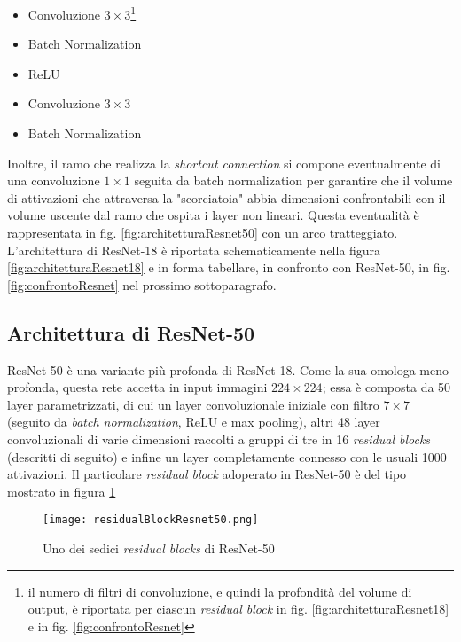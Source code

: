 \begin{itemize}
\item Convoluzione $3\times 3$\footnote{il numero di filtri di convoluzione, e quindi la profondità del volume di output, è riportata per ciascun \textit{residual block} in fig. \ref{fig:architetturaResnet18} e in fig. \ref{fig:confrontoResnet}}
\item Batch Normalization
\item ReLU
\item Convoluzione $3\times 3$
\item Batch Normalization
\end{itemize}

Inoltre, il ramo che realizza la \textit{shortcut connection} si compone eventualmente di una convoluzione $1\times 1$ seguita da batch normalization per garantire che il volume di attivazioni che attraversa la "scorciatoia" abbia dimensioni confrontabili con il volume uscente dal ramo che ospita i layer non lineari. Questa eventualità è rappresentata in fig. \ref{fig:architetturaResnet50} con un arco tratteggiato.\\

L'architettura di ResNet-18 è riportata schematicamente nella figura \ref{fig:architetturaResnet18} e in forma tabellare, in confronto con ResNet-50, in fig. \ref{fig:confrontoResnet} nel prossimo sottoparagrafo.

\subsection{Architettura di ResNet-50}
ResNet-50 è una variante più profonda di ResNet-18. Come la sua omologa meno profonda, questa rete accetta in input immagini $224\times 224$; essa è composta da 50 layer parametrizzati, di cui un layer convoluzionale iniziale con filtro $7\times 7$ (seguito da \textit{batch normalization}, ReLU e max pooling), altri 48 layer convoluzionali di varie dimensioni raccolti a gruppi di tre in 16 \textit{residual blocks} (descritti di seguito) e infine  un layer completamente connesso con le usuali 1000 attivazioni.
Il particolare \textit{residual block} adoperato in ResNet-50 è del tipo mostrato in figura \ref{fig:residualBlockResnet50}

\begin{figure}[H]
\centering
\texttt{[image: residualBlockResnet50.png]}
\caption{Uno dei sedici \textit{residual blocks} di ResNet-50}
\label{fig:residualBlockResnet50}
\end{figure}

